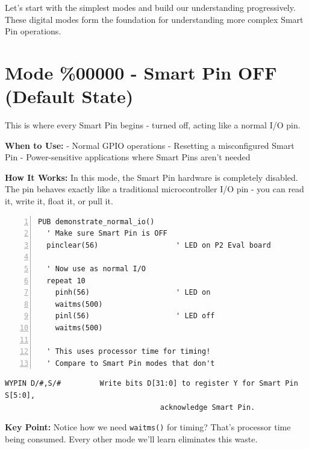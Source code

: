 \documentclass[11pt,a4paper,oneside,english]{book}
\begin{document}
Let's start with the simplest modes and build our understanding
progressively. These digital modes form the foundation for understanding
more complex Smart Pin operations.

\hypertarget{mode-00000---smart-pin-off-default-state}{%
\section{Mode \%00000 - Smart Pin OFF (Default
State)}\label{mode-00000---smart-pin-off-default-state}}

This is where every Smart Pin begins - turned off, acting like a normal
I/O pin.

\textbf{When to Use:} - Normal GPIO operations - Resetting a
misconfigured Smart Pin - Power-sensitive applications where Smart Pins
aren't needed

\textbf{How It Works:} In this mode, the Smart Pin hardware is
completely disabled. The pin behaves exactly like a traditional
microcontroller I/O pin - you can read it, write it, float it, or pull
it.

\begin{Spin2Block}
\begin{Verbatim}[numbers=left,numbersep=5pt,xleftmargin=15pt]
PUB demonstrate_normal_io()
  ' Make sure Smart Pin is OFF
  pinclear(56)                  ' LED on P2 Eval board
  
  ' Now use as normal I/O
  repeat 10
    pinh(56)                    ' LED on
    waitms(500)
    pinl(56)                    ' LED off
    waitms(500)
    
  ' This uses processor time for timing!
  ' Compare to Smart Pin modes that don't
\end{Verbatim}
\end{Spin2Block}

\begin{PASM2Block}
\begin{lstlisting}
WYPIN D/#,S/#         Write bits D[31:0] to register Y for Smart Pin S[5:0],
                                    acknowledge Smart Pin.
\end{lstlisting}
\end{PASM2Block}

\textbf{Key Point:} Notice how we need
\passthrough{\lstinline!waitms()!} for timing? That's processor time
being consumed. Every other mode we'll learn eliminates this waste.
\end{document}
